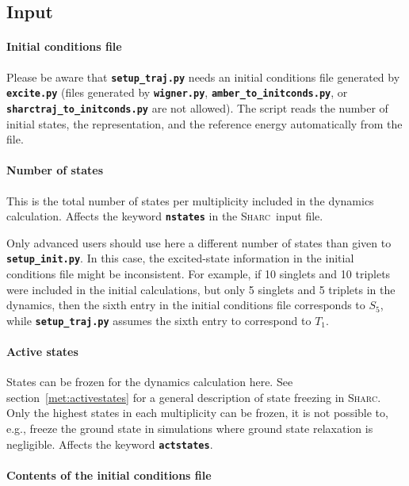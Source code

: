 \documentclass[a4paper,10pt,DIV=15,openany]{scrbook}
\newcommand{\sharc}{\textsc{Sharc}}
\newcommand{\ttt}[1]{\textbf{\texttt{#1}}}
\begin{document}
\subsection{Input}

\paragraph{Initial conditions file}

Please be aware that \ttt{setup\_traj.py} needs an initial conditions file generated by \ttt{excite.py} (files generated by \ttt{wigner.py}, \ttt{amber\_to\_initconds.py}, or \ttt{sharctraj\_to\_initconds.py} are not allowed). The script reads the number of initial states, the representation, and the reference energy automatically from the file.

\paragraph{Number of states}

This is the total number of states per multiplicity included in the dynamics calculation. Affects the keyword \ttt{nstates} in the \sharc\ input file.

Only advanced users should use here a different number of states than given to \ttt{setup\_init.py}. In this case, the excited-state information in the initial conditions file might be inconsistent. For example, if 10 singlets and 10 triplets were included in the initial calculations, but only 5 singlets and 5 triplets in the dynamics, then the sixth entry in the initial conditions file corresponds to $S_5$, while \ttt{setup\_traj.py} assumes the sixth entry to correspond to $T_1$.

\paragraph{Active states}

States can be frozen for the dynamics calculation here. See section~\ref{met:activestates} for a general description of state freezing in \sharc. Only the highest states in each multiplicity can be frozen, it is not possible to, e.g., freeze the ground state in simulations where ground state relaxation is negligible. Affects the keyword \ttt{actstates}.

\paragraph{Contents of the initial conditions file}
\end{document}
